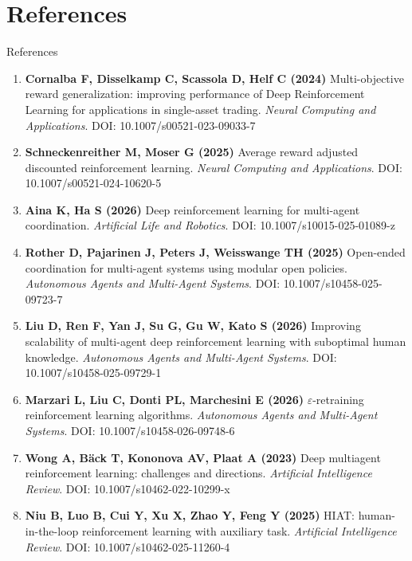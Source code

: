 \section{References}

\begin{frame}{References}
\scriptsize
{}
\begin{enumerate}\itemsep0.28em\leftskip=-0.55em
\item \textbf{Cornalba F, Disselkamp C, Scassola D, Helf C (2024)} Multi-objective reward generalization: improving performance of Deep Reinforcement Learning for applications in single-asset trading. \textit{Neural Computing and Applications}. DOI: 10.1007/s00521-023-09033-7
\item \textbf{Schneckenreither M, Moser G (2025)} Average reward adjusted discounted reinforcement learning. \textit{Neural Computing and Applications}. DOI: 10.1007/s00521-024-10620-5
\item \textbf{Aina K, Ha S (2026)} Deep reinforcement learning for multi-agent coordination. \textit{Artificial Life and Robotics}. DOI: 10.1007/s10015-025-01089-z
\item \textbf{Rother D, Pajarinen J, Peters J, Weisswange TH (2025)} Open-ended coordination for multi-agent systems using modular open policies. \textit{Autonomous Agents and Multi-Agent Systems}. DOI: 10.1007/s10458-025-09723-7
\item \textbf{Liu D, Ren F, Yan J, Su G, Gu W, Kato S (2026)} Improving scalability of multi-agent deep reinforcement learning with suboptimal human knowledge. \textit{Autonomous Agents and Multi-Agent Systems}. DOI: 10.1007/s10458-025-09729-1
\item \textbf{Marzari L, Liu C, Donti PL, Marchesini E (2026)} $\varepsilon$-retraining reinforcement learning algorithms. \textit{Autonomous Agents and Multi-Agent Systems}. DOI: 10.1007/s10458-026-09748-6
\item \textbf{Wong A, B\"ack T, Kononova AV, Plaat A (2023)} Deep multiagent reinforcement learning: challenges and directions. \textit{Artificial Intelligence Review}. DOI: 10.1007/s10462-022-10299-x
\item \textbf{Niu B, Luo B, Cui Y, Xu X, Zhao Y, Feng Y (2025)} HIAT: human-in-the-loop reinforcement learning with auxiliary task. \textit{Artificial Intelligence Review}. DOI: 10.1007/s10462-025-11260-4
\end{enumerate}
\end{frame}

